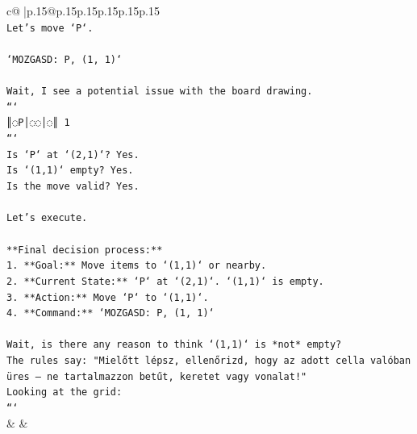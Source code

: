 \documentclass{article}
\begin{document}
{\begin{supertabular}{c@{$\;$}|p{.15\linewidth}@{}p{.15\linewidth}p{.15\linewidth}p{.15\linewidth}p{.15\linewidth}p{.15\linewidth}}
{{{\\ 
\texttt{Let's move `P`.} \\
\\ 
\texttt{`MOZGASD: P, (1, 1)`} \\
\\ 
\texttt{Wait, I see a potential issue with the board drawing.} \\
\texttt{```} \\
\texttt{║◌P│◌◌│◌║ 1} \\
\texttt{```} \\
\texttt{Is `P` at `(2,1)`? Yes.} \\
\texttt{Is `(1,1)` empty? Yes.} \\
\texttt{Is the move valid? Yes.} \\
\\ 
\texttt{Let's execute.} \\
\\ 
\texttt{**Final decision process:**} \\
\texttt{1.  **Goal:** Move items to `(1,1)` or nearby.} \\
\texttt{2.  **Current State:** `P` at `(2,1)`. `(1,1)` is empty.} \\
\texttt{3.  **Action:** Move `P` to `(1,1)`.} \\
\texttt{4.  **Command:** `MOZGASD: P, (1, 1)`} \\
\\ 
\texttt{Wait, is there any reason to think `(1,1)` is *not* empty?} \\
\texttt{The rules say: "Mielőtt lépsz, ellenőrizd, hogy az adott cella valóban üres – ne tartalmazzon betűt, keretet vagy vonalat!"} \\
\texttt{Looking at the grid:} \\
\texttt{```} \\
            }
        }
    }
    & & \\ \\


\end{supertabular}}
\end{document}
